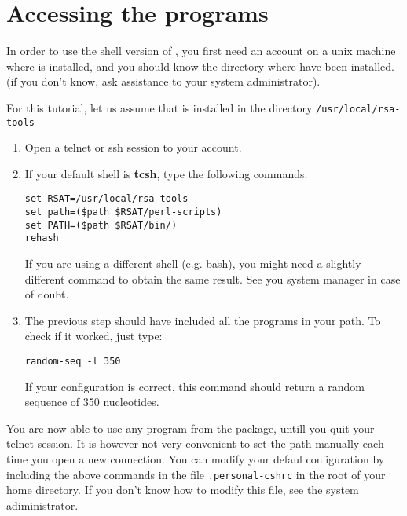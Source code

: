 
\section{Accessing the programs}

In order to use the shell version of \RSAT, you first need an account
on a unix machine where \RSAT is installed, and you should know the
directory where \RSAT have been installed. (if you don't know, ask
assistance to your system administrator).

For this tutorial, let us assume that \RSAT is installed in the
directory \texttt{/usr/local/rsa-tools}

\begin{enumerate}

\item Open a telnet or ssh session to your account.

\item If your default shell is \textbf{tcsh}, type the following
commands.

\begin{verbatim}
set RSAT=/usr/local/rsa-tools
set path=($path $RSAT/perl-scripts)
set PATH=($path $RSAT/bin/)
rehash
\end{verbatim}

If you are using a different shell (e.g. bash), you might need a
slightly different command to obtain the same result. See you system
manager in case of doubt.

\item The previous step should have included all the \RSAT programs in
your path.  To check if it worked, just type:

\begin{verbatim}
random-seq -l 350
\end{verbatim}

If your configuration is correct, this command should return a random
sequence of 350 nucleotides.

\end{enumerate}

You are now able to use any program from the \RSAT package, untill you
quit your telnet session. It is however not very convenient to set the
path manually each time you open a new connection. You can modify your
defaul configuration by including the above commands in the file
\texttt{.personal-cshrc} in the root of your home directory. If you
don't know how to modify this file, see the system adiministrator.
